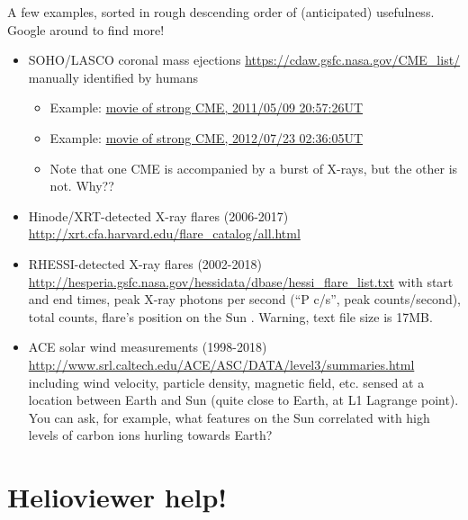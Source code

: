 \documentclass[11pt]{article}%
\begin{document}
A few examples, sorted in rough descending order of (anticipated) usefulness.
Google around to find more!

\begin{itemize}
    \item SOHO/LASCO coronal mass ejections \url{https://cdaw.gsfc.nasa.gov/CME_list/}
        manually identified by humans
        \begin{itemize}
        \item Example:
            \href{https://cdaw.gsfc.nasa.gov/CME_list/UNIVERSAL/2011_05/jsmovies/2011_05/20110509.205726.p073g/c2_rdif.html}{movie of strong CME, 2011/05/09 20:57:26UT}
        \item Example:
            \href{https://cdaw.gsfc.nasa.gov/CME_list/UNIVERSAL/2012_07/jsmovies/2012_07/20120723.023605.p286g/c2_rdif.html}{movie of strong CME, 2012/07/23 02:36:05UT}
        \item Note that one CME is accompanied by a burst of X-rays, but the
            other is not.  Why??
        \end{itemize}
    \item Hinode/XRT-detected X-ray flares (2006-2017) \url{http://xrt.cfa.harvard.edu/flare_catalog/all.html}
    \item RHESSI-detected X-ray flares (2002-2018) \url{http://hesperia.gsfc.nasa.gov/hessidata/dbase/hessi_flare_list.txt}
        with start and end times, peak X-ray photons per second (``P c/s'',
        peak counts/second), total counts, flare's position on the Sun .
        Warning, text file size is 17MB.
    \item ACE solar wind measurements (1998-2018)
        \url{http://www.srl.caltech.edu/ACE/ASC/DATA/level3/summaries.html}
        including wind velocity, particle density, magnetic field, etc.
        sensed at a location between Earth and Sun (quite close to Earth, at L1
        Lagrange point).
        You can ask, for example, what features on the Sun correlated with high
        levels of carbon ions hurling towards Earth?
\end{itemize}

\section{Helioviewer help!}
\end{document}
